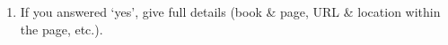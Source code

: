 \begin{enumerate}
\begin{enumerate}
        
        \item If you answered `yes', give full details (book \& page, URL \& location within the page, etc.).\\
        
        \begin{tcolorbox}[fit,height=4cm, width=15cm, blank, borderline={1pt}{-2pt},nobeforeafter]
\begin{answer}
        
        
\end{answer}
        \end{tcolorbox}
        
    \end{enumerate}
\end{enumerate}